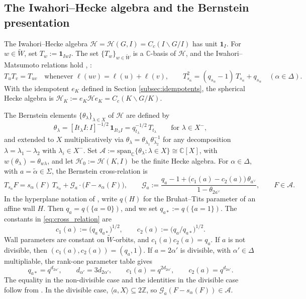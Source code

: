 \documentclass[12pt]{article}
\numberwithin{equation}{section}
\theoremstyle{definition}
\theoremstyle{remark}
\theoremstyle{plain}
\begin{document}
\subsection{The Iwahori--Hecke algebra and the Bernstein presentation}\label{subsec:bernstein}
The Iwahori--Hecke algebra $\mathcal{H} = \mathcal{H}(G,I)=C_c(I\backslash G/I)$ has unit $\mathbf{1}_I$. For $w \in \widetilde{W}$, set $T_w := \mathbf{1}_{IwI}$. The set $\{T_w\}_{w\in\widetilde{W}}$ is a $\mathbb{C}$-basis of $\mathcal{H}$, and the Iwahori--Matsumoto relations hold \cite{IM65}, \cite[Proposition 4.1.1]{Rostami}:
$$T_u T_v = T_{uv} \quad \text{whenever } \ell(uv) = \ell(u) + \ell(v), \qquad T_{s_\alpha}^{2} = (q_{s_\alpha}-1)\,T_{s_\alpha} + q_{s_\alpha} \quad (\alpha \in \Delta).$$ With the idempotent $e_K$ defined in Section \ref{subsec:idempotents}, the spherical Hecke algebra is $\mathcal{H}_K := e_K \mathcal{H} e_K=C_c(K\backslash G/K)$.

The Bernstein elements $\{\theta_\lambda\}_{\lambda\in X}$ of $\mathcal{H}$ are defined by
$$\theta_\lambda = [I t_\lambda I : I]^{-1/2}\,\mathbf{1}_{I t_\lambda I} = q_{t_\lambda}^{-1/2}\,T_{t_\lambda} \qquad \text{for } \lambda \in X^-,$$
and extended to $X$ multiplicatively via $\theta_\lambda = \theta_{\lambda_1}\theta_{\lambda_2}^{-1}$ for any decomposition $\lambda = \lambda_1 - \lambda_2$ with $\lambda_i \in X^-$. Set $\mathcal{A} := \mathrm{span}_\mathbb{C}\{\theta_\lambda : \lambda \in X\} \cong \mathbb{C}[X]$, with $w(\theta_\lambda) = \theta_{w\lambda}$, and let $\mathcal{H}_0 := \mathcal{H}(K,I)$ be the finite Hecke algebra. For $\alpha \in \Delta$, with $a = \tilde\alpha \in \Sigma$, the Bernstein cross-relation is
\begin{equation}\label{eq:cross_relation}
T_{s_\alpha} F = s_\alpha(F)\,T_{s_\alpha} + \mathcal{G}_a\cdot\big(F - s_\alpha(F)\big), \qquad \mathcal{G}_a := \frac{q_a - 1 + \big(c_1(a) - c_2(a)\big)\,\theta_{a^\vee}}{1 - \theta_{2a^\vee}}, \qquad F\in\mathcal{A}.
\end{equation}
In the hyperplane notation of \cite[Section 7.1]{Rostami}, write $q(H)$ for the Bruhat--Tits parameter of an affine wall $H$. Then $q_a=q(\{a=0\})$, and we set $q_{a*}:=q(\{a=1\})$. The constants in \eqref{eq:cross_relation} are
$$c_1(a) := \big(q_a\, q_{a*}\big)^{1/2}, \qquad c_2(a) := \big(q_a/ q_{a*}\big)^{1/2}.$$
Wall parameters are constant on $\widetilde{W}$-orbits, and $c_1(a)c_2(a)=q_a$. If $a$ is not divisible, then $(c_1(a),c_2(a))=(q_a,1)$. If $a=2\alpha'$ is divisible, with $\alpha'\in\Delta$ multipliable, the rank-one parameter table gives
$$q_{a*}=q^{d_{2\alpha'}},\qquad d_{\alpha'}=3d_{2\alpha'},\qquad c_1(a)=q^{2d_{2\alpha'}},\qquad c_2(a)=q^{d_{2\alpha'}}.$$
The equality in the non-divisible case and the identities in the divisible case follow from \cite[Sections 1.8 and 4]{Tits}. In the divisible case, $\langle a,X\rangle\subseteq2\mathbb Z$, so $\mathcal G_a(F-s_\alpha(F))\in\mathcal A$.
\end{document}
